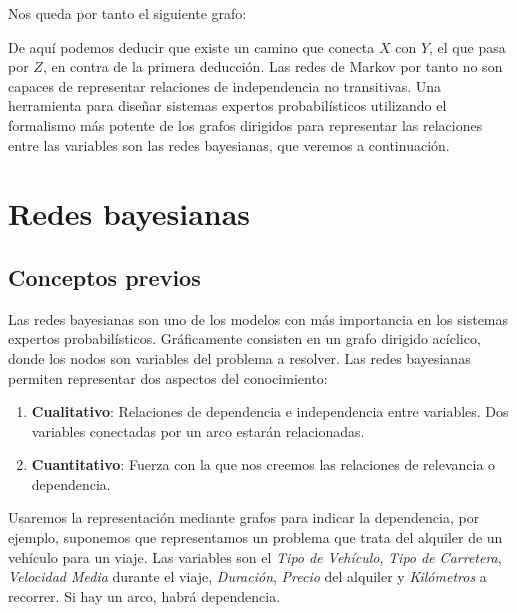 \documentclass{article}
\theoremstyle{definition_wo_parentheses}
\begin{document}
Nos queda por tanto el siguiente grafo:
\begin{center}
\end{center}

De aquí podemos deducir que existe un camino que conecta $X$ con $Y$, el que pasa por $Z$, en contra de la primera deducción. Las redes de Markov por tanto no son capaces de representar relaciones de independencia no transitivas. Una herramienta para diseñar sistemas expertos probabilísticos utilizando el formalismo más potente de los grafos dirigidos para representar las relaciones entre las variables son las redes bayesianas, que veremos a continuación.

\section{Redes bayesianas}

\subsection{Conceptos previos}

Las redes bayesianas son uno de los modelos con más importancia en los sistemas expertos probabilísticos. Gráficamente consisten en un grafo dirigido acíclico, donde los nodos son variables del problema a resolver. Las redes bayesianas permiten representar dos aspectos del conocimiento:

\begin{enumerate}
\item \textbf{Cualitativo}: Relaciones de dependencia e independencia entre variables. Dos variables conectadas por un arco estarán relacionadas.
\item \textbf{Cuantitativo}: Fuerza con la que nos creemos las relaciones de relevancia o dependencia.
\end{enumerate}

Usaremos la representación mediante grafos para indicar la dependencia, por ejemplo, suponemos que representamos un problema que trata del alquiler de un vehículo para un viaje. Las variables son el \textit{Tipo de Vehículo}, \textit{Tipo de Carretera}, \textit{Velocidad Media} durante el viaje, \textit{Duración}, \textit{Precio} del alquiler y \textit{Kilómetros} a recorrer. Si hay un arco, habrá dependencia. 
\end{document}
